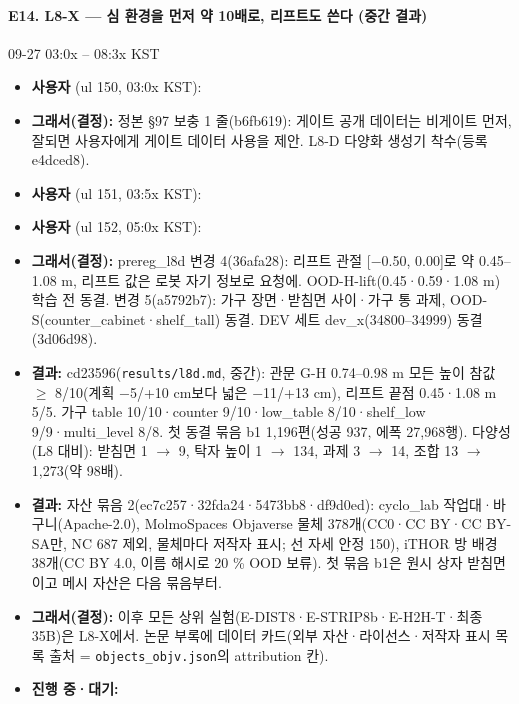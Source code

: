 \paragraph{E14. L8-X --- 심 환경을 먼저 약 10배로, 리프트도 쓴다 (중간 결과)}
{\small 09-27 03:0x -- 08:3x KST}
\begin{itemize}
  \item \textbf{사용자} (ul 150, 03:0x KST): 
  \item \textbf{그래서(결정):} 정본 §97 보충 1 줄(b6fb619): 게이트 공개 데이터는 비게이트 먼저, 잘되면 사용자에게 게이트 데이터 사용을 제안. L8-D 다양화 생성기 착수(등록 e4dced8).
  \item \textbf{사용자} (ul 151, 03:5x KST): 
  \item \textbf{사용자} (ul 152, 05:0x KST): 
  \item \textbf{그래서(결정):} prereg\_l8d 변경 4(36afa28): 리프트 관절 [$-$0.50, 0.00]로 약 0.45--1.08 m, 리프트 값은 로봇 자기 정보로 요청에. OOD-H-lift(0.45·0.59·1.08 m) 학습 전 동결. 변경 5(a5792b7): 가구 장면·받침면 사이·가구 통 과제, OOD-S(counter\_cabinet·shelf\_tall) 동결. DEV 세트 dev\_x(34800--34999) 동결(3d06d98).
  \item \textbf{결과:} cd23596(\texttt{results/\allowbreak{}l8d.\allowbreak{}md}, 중간): 관문 G-H 0.74--0.98 m 모든 높이 참값 $\geq$ 8/10(계획 $-$5/+10 cm보다 넓은 $-$11/+13 cm), 리프트 끝점 0.45·1.08 m 5/5. 가구 table 10/10·counter 9/10·low\_table 8/10·shelf\_low 9/9·multi\_level 8/8. 첫 동결 묶음 b1 1,196편(성공 937, 에폭 27,968행). 다양성(L8 대비): 받침면 1 $\rightarrow$ 9, 탁자 높이 1 $\rightarrow$ 134, 과제 3 $\rightarrow$ 14, 조합 13 $\rightarrow$ 1,273(약 98배).
  \item \textbf{결과:} 자산 묶음 2(ec7c257·32fda24·5473bb8·df9d0ed): cyclo\_lab 작업대·바구니(Apache-2.0), MolmoSpaces Objaverse 물체 378개(CC0·CC BY·CC BY-SA만, NC 687 제외, 물체마다 저작자 표시; 선 자세 안정 150), iTHOR 방 배경 38개(CC BY 4.0, 이름 해시로 20 \% OOD 보류). 첫 묶음 b1은 원시 상자 받침면이고 메시 자산은 다음 묶음부터.
  \item \textbf{그래서(결정):} 이후 모든 상위 실험(E-DIST8·E-STRIP8b·E-H2H-T·최종 35B)은 L8-X에서. 논문 부록에 데이터 카드(외부 자산·라이선스·저작자 표시 목록 출처 = \texttt{objects\_\allowbreak{}objv.\allowbreak{}json}의 attribution 칸).
  \item \textbf{진행 중·대기:} 
\end{itemize}

